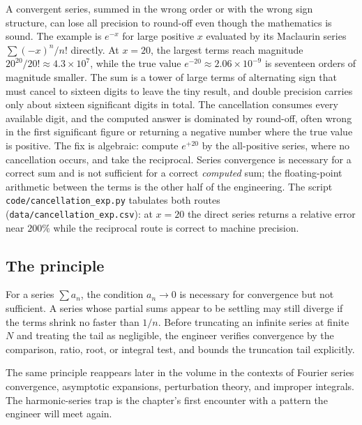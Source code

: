 A convergent series, summed in the wrong order or with the wrong sign
structure, can lose all precision to round-off even though the
mathematics is sound. The example is $e^{-x}$ for large positive $x$
evaluated by its Maclaurin series $\sum (-x)^{n}/n!$ directly. At $x =
20$, the largest terms reach magnitude $20^{20}/20! \approx 4.3 \times
10^{7}$, while the true value $e^{-20} \approx 2.06 \times 10^{-9}$ is
seventeen orders of magnitude smaller. The sum is a tower of large
terms of alternating sign that must cancel to sixteen digits to leave
the tiny result, and double precision carries only about sixteen
significant digits in total. The cancellation consumes every available
digit, and the computed answer is dominated by round-off, often wrong in
the first significant figure or returning a negative number where the
true value is positive. The fix is algebraic: compute $e^{+20}$ by the
all-positive series, where no cancellation occurs, and take the
reciprocal. Series convergence is necessary for a correct sum and is not
sufficient for a correct \emph{computed} sum; the floating-point
arithmetic between the terms is the other half of the engineering. The
script \texttt{code/cancellation\_exp.py} tabulates both routes
(\texttt{data/cancellation\_exp.csv}): at $x = 20$ the direct series
returns a relative error near $200\%$ while the reciprocal route is
correct to machine precision.

\subsection{The principle}

\begin{principle}
For a series $\sum a_{n}$, the condition $a_{n} \to 0$ is necessary
for convergence but not sufficient. A series whose partial sums
appear to be settling may still diverge if the terms shrink no faster
than $1/n$. Before truncating an infinite series at finite $N$ and
treating the tail as negligible, the engineer verifies convergence by
the comparison, ratio, root, or integral test, and bounds the
truncation tail explicitly.
\end{principle}

The same principle reappears later in the volume in the contexts of
Fourier series convergence, asymptotic expansions, perturbation
theory, and improper integrals. The harmonic-series trap is the
chapter's first encounter with a pattern the engineer will meet again.

